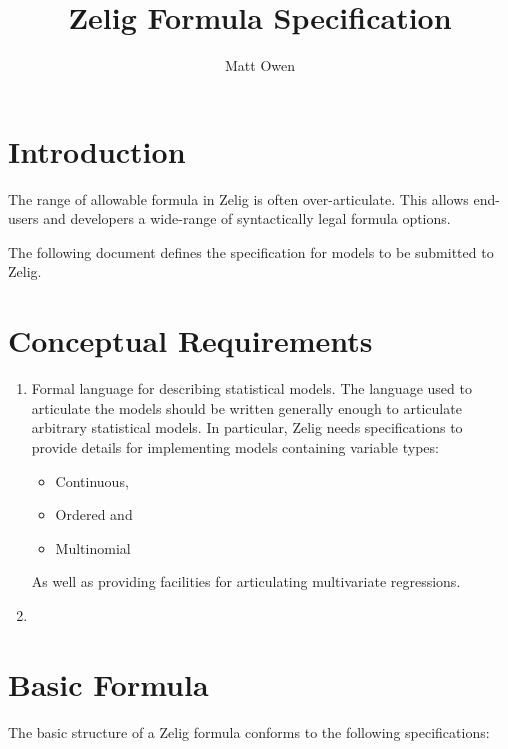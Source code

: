 \documentclass{article}
\title{Zelig Formula Specification}
\author{Matt Owen}
\begin{document}
\maketitle

\section{Introduction}

The range of allowable formula in Zelig is often over-articulate. This allows
end-users and developers a wide-range of syntactically legal formula options.

The following document defines the specification for models to be submitted to
Zelig.

\section{}
\label{}



\section{Conceptual Requirements}
\label{Conceptual-Requirements}

\begin{enumerate}
  \item Formal language for describing statistical models. The language used to
    articulate the models should be written generally enough to articulate 
    arbitrary statistical models. In particular, Zelig needs specifications to
    provide details for implementing models containing variable types:
    \begin{itemize}
      \item Continuous,
      \item Ordered and
      \item Multinomial
    \end{itemize}

    As well as providing facilities for articulating multivariate regressions.

  \item 
\end{enumerate}


\section{Basic Formula}

The basic structure of a Zelig formula conforms to the following specifications:
\end{document}
